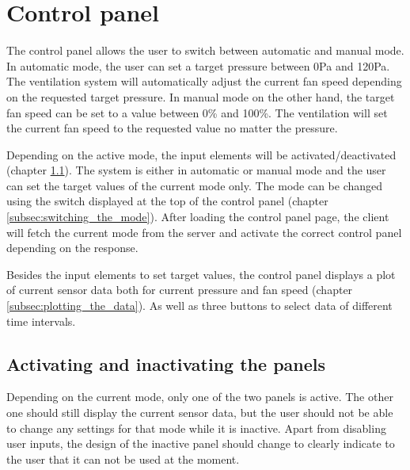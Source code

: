 
\section{Control panel}
\label{sec:control_panel}

The control panel allows the user to switch between automatic and manual mode. In automatic mode, the user can set a target pressure between 0Pa and 120Pa. The ventilation system will automatically adjust the current fan speed depending on the requested target pressure. In manual mode on the other hand, the target fan speed can be set to a value between 0\% and 100\%. The ventilation will set the current fan speed to the requested value no matter the pressure. 

Depending on the active mode, the input elements will be activated/deactivated (chapter \ref{subsec:activating_and_inactivating_the_panels}). The system is either in automatic or manual mode and the user can set the target values of the current mode only.  The mode can be changed using the switch displayed at the top of the control panel (chapter \ref{subsec:switching_the_mode}). After loading the control panel page, the client will fetch the current mode from the server and activate the correct control panel depending on the response. 

Besides the input elements to set target values, the control panel displays a plot of current sensor data both for current pressure and fan speed (chapter \ref{subsec:plotting_the_data}). As well as three buttons to select data of different time intervals. 



\subsection{Activating and inactivating the panels}
\label{subsec:activating_and_inactivating_the_panels}

Depending on the current mode, only one of the two panels is active. The other one should still display the current sensor data,  but the user should not be able to change any settings for that mode while it is inactive. Apart from disabling user inputs, the design of the inactive panel should change to clearly indicate to the user that it can not be used at the moment.

